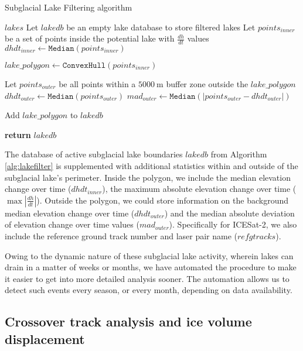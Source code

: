 \begin{algorithm}
  \caption{Subglacial Lake Filtering algorithm}\label{alg:lakefilter}
  \begin{algorithmic}
      \Require $lakes$
      \State Let $lakedb$ be an empty lake database to store filtered lakes
        \State Let $points_{inner}$ be a set of points inside the potential lake with $\frac{dh}{dt}$ values
        \State $dhdt_{inner} \gets \texttt{Median}(points_{inner})$

        \State $lake\_polygon \gets \texttt{ConvexHull}(points_{inner})$

        \State Let $points_{outer}$ be all points within a $\SI{5000}{\metre}$ buffer zone outside the $lake\_polygon$
        \State $dhdt_{outer} \gets \texttt{Median}(points_{outer})$
        \State $mad_{outer} \gets \texttt{Median}(\lvert points_{outer} - dhdt_{outer} \rvert)$  %

          \State Add $lake\_polygon$ to $lakedb$
        \EndIf

      \EndFor
    \State \textbf{return} $lakedb$
  \end{algorithmic}
\end{algorithm}

The database of active subglacial lake boundaries $lakedb$ from Algorithm \ref{alg:lakefilter} is supplemented with additional statistics within and outside of the subglacial lake's perimeter.
Inside the polygon, we include the median elevation change over time ($dhdt_{inner}$), the maximum absolute elevation change over time ($\max |\frac{dh}{dt}|$).
Outside the polygon, we could store information on the background median elevation change over time ($dhdt_{outer}$) and the median absolute deviation of elevation change over time values ($mad_{outer}$).
Specifically for ICESat-2, we also include the reference ground track number and laser pair name ($refgtracks$).

Owing to the dynamic nature of these subglacial lake activity, wherein lakes can drain in a matter of weeks or months, we have automated the procedure to make it easier to get into more detailed analysis sooner.
The automation allows us to detect such events every season, or every month, depending on data availability.

\subsection{Crossover track analysis and ice volume displacement} \label{sec:crossover_displacement}

